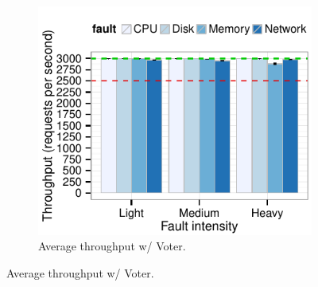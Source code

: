 \begin{figure}
\begin{subfigure}[b]{0.48\textwidth}
                  \includegraphics[width=1\textwidth]{inputs/img/fault_impact_this_throughput_voltdb_voter}
                \caption{Average throughput w/ Voter.}
                \label{fig:tejo_overview_detecting}
        \end{subfigure}


\end{figure}
